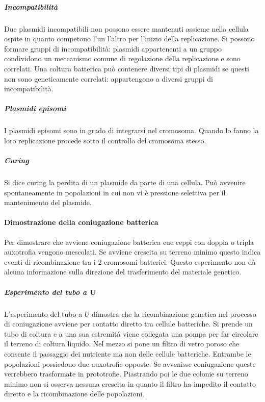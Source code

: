				\subparagraph{Incompatibilit\`a}
				Due plasmidi incompatibili non possono essere mantenuti assieme nella cellula ospite in quanto competono l'un l'altro per l'inizio della replicazione. 
				Si possono formare gruppi di incompatibilit\`a: plasmidi appartenenti a un gruppo condividono un meccanismo comune di regolazione della replicazione e sono correlati.
				Una coltura batterica pu\`o contenere diversi tipi di plasmidi se questi non sono geneticamente correlati: appartengono a diversi gruppi di incompatibilit\`a.

				\subparagraph{Plasmidi episomi}
				I plasmidi episomi sono in grado di integrarsi nel cromosoma.
				Quando lo fanno la loro replicazione procede sotto il controllo del cromosoma stesso.

				\subparagraph{Curing}
				Si dice curing la perdita di un plasmide da parte di una cellula.
				Pu\`o avvenire spontaneamente in popolazioni in cui non vi \`e pressione selettiva per il mantenimento del plasmide.

			\paragraph{Dimostrazione della coniugazione batterica}
			Per dimostrare che avviene coniugazione batterica eue ceppi con doppia o tripla auxotrofia vengono mescolati. 
			Se avviene crescita su terreno minimo questo indica eventi di ricombinazione tra i $2$ cromosomi batterici.
			Questo esperimento non dà alcuna informazione sulla direzione del trasferimento del materiale genetico.

				\subparagraph{Esperimento del tubo a $\mathbf{U}$}
				L'esperimento del tubo a $U$ dimostra che la ricombinazione genetica nel processo di coniugazione avviene per contatto diretto tra cellule batteriche.
				Si prende un tubo di coltura e a una sua estremit\`a viene collegata una pompa per far circolare il terreno di coltura liquido.
				Nel mezzo si pone un filtro di vetro poroso che consente il passaggio dei nutriente ma non delle cellule batteriche.
				Entrambe le popolazioni possiedono due auxotrofie opposte.
				Se avvenisse coniugazione queste verrebbero trasformate in prototrofie.
				Piastrando poi le due colonie su terreno minimo non si osserva nessuna crescita in quanto il filtro ha impedito il contatto diretto e la ricombinazione delle popolazioni.

